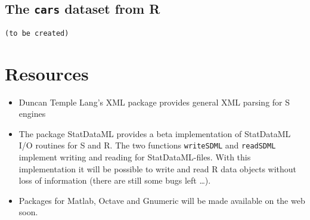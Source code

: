 \documentclass[a4paper]{article}
\begin{document}
\subsection{The \texttt{cars} dataset from R}

\begin{verbatim}
(to be created)
\end{verbatim}

\section{Resources}

\begin{itemize}
 \item Duncan Temple Lang's XML package provides general XML parsing
  for S engines
  
 \item The package StatDataML provides a beta implementation of
  StatDataML I/O routines for S and R.  The two functions
  \texttt{writeSDML} and \texttt{readSDML} implement writing and
  reading for StatDataML-files.  With this implementation it will be
  possible to write and read R data objects without loss of
  information (there are still some bugs left \ldots).
  
 \item Packages for Matlab, Octave and Gnumeric will be made available
  on the web soon.
  
\end{itemize}
\end{document}
